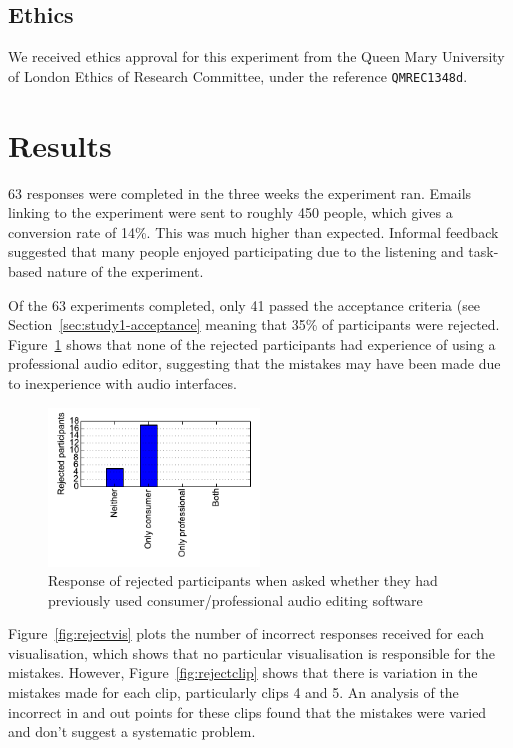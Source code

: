 \subsection{Ethics}
We received ethics approval for this experiment from the Queen Mary University of London Ethics of Research Committee, under the reference \texttt{QMREC1348d}.

\section{Results}
63 responses were completed in the three weeks the experiment ran. Emails linking to the experiment were sent to
roughly 450 people, which gives a conversion rate of 14\%. This was much higher than expected. Informal feedback
suggested that many people enjoyed participating due to the listening and task-based nature of the experiment. 

Of the 63 experiments completed, only 41 passed the acceptance criteria (see Section~\ref{sec:study1-acceptance}
meaning that 35\% of participants were rejected. Figure~\ref{fig:rejectdaw} shows that none of the rejected
participants had experience of using a professional audio editor, suggesting that the mistakes may have been made due
to inexperience with audio interfaces.

\begin{figure}[ht]
  \centering
  \includegraphics[width=0.5\textwidth]{figs/reject-daw.pdf}
  \caption{Response of rejected participants when asked whether they had previously used consumer/professional audio
    editing software}
  \label{fig:rejectdaw}
\end{figure}

Figure~\ref{fig:rejectvis} plots the number of incorrect responses received for each visualisation, which shows that no
particular visualisation is responsible for the mistakes. However, Figure~\ref{fig:rejectclip} shows that there is
variation in the mistakes made for each clip, particularly clips 4 and 5. An analysis of the incorrect in and out
points for these clips found that the mistakes were varied and don't suggest a systematic problem. 

